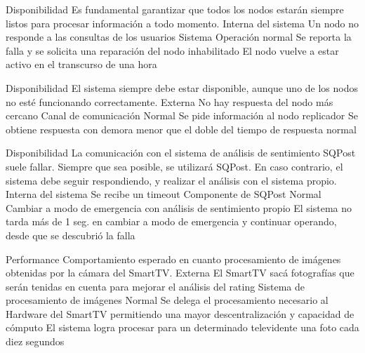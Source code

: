   \begin{enumerate}


\QA
  {Disponibilidad} %
  {Es fundamental garantizar que todos los nodos estarán siempre listos para procesar información a todo momento.} %
  {Interna del sistema} %
  {Un nodo no responde a las consultas de los usuarios} %
  {Sistema} %
  {Operación normal} %
  {Se reporta la falla y se solicita una reparación del nodo inhabilitado} %
  {El nodo vuelve a estar activo en el transcurso de una hora} %

\QA
  {Disponibilidad} %
  {El sistema siempre debe estar disponible, aunque uno de los nodos no esté funcionando correctamente.} %
  {Externa} %
  {No hay respuesta del nodo más cercano} %
  {Canal de comunicación} %
  {Normal} %
  {Se pide información al nodo replicador} %
  {Se obtiene respuesta con demora menor que el doble del tiempo de respuesta normal} %

\QA
  {Disponibilidad} %
  {La comunicación con el sistema de análisis de sentimiento SQPost suele fallar. Siempre que sea posible, se utilizará SQPost. En caso contrario, el sistema debe seguir respondiendo, y realizar el análisis con el sistema propio.} %
  {Interna del sistema} %
  {Se recibe un timeout} %
  {Componente de SQPost} %
  {Normal} %
  {Cambiar a modo de emergencia con análisis de sentimiento propio} %
  {El sistema no tarda más de 1 seg. en cambiar a modo de emergencia y continuar operando, desde que se descubrió la falla} %



\QA
  {Performance} %
  {Comportamiento esperado en cuanto procesamiento de imágenes obtenidas por la cámara del SmartTV.} %
  {Externa} %
  {El SmartTV sacá fotografías que serán tenidas en cuenta para mejorar el análisis del rating} %
  {Sistema de procesamiento de imágenes} %
  {Normal} %
  {Se delega el procesamiento necesario al Hardware del SmartTV permitiendo una mayor descentralización y capacidad de cómputo} %
  {El sistema logra procesar para un determinado televidente una foto cada diez segundos} %


\end{enumerate}

